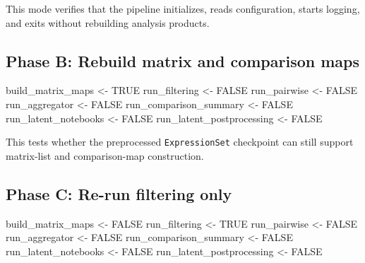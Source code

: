 \documentclass[
  letterpaper,
  DIV=11,
  numbers=noendperiod,
  openany,
  oneside]{scrreprt}
\newenvironment{Shaded}{\begin{snugshade}}{\end{snugshade}}
\newcommand{\ConstantTok}[1]{\textcolor[rgb]{0.56,0.35,0.01}{#1}}
\newcommand{\NormalTok}[1]{\textcolor[rgb]{0.00,0.23,0.31}{#1}}
\newcommand{\OtherTok}[1]{\textcolor[rgb]{0.00,0.23,0.31}{#1}}
\begin{document}
This mode verifies that the pipeline initializes, reads configuration,
starts logging, and exits without rebuilding analysis products.

\subsection*{Phase B: Rebuild matrix and comparison
maps}\label{phase-b-rebuild-matrix-and-comparison-maps}

\begin{Shaded}
\begin{Highlighting}[]
\NormalTok{build\_matrix\_maps       }\OtherTok{\textless{}{-}} \ConstantTok{TRUE}
\NormalTok{run\_filtering           }\OtherTok{\textless{}{-}} \ConstantTok{FALSE}
\NormalTok{run\_pairwise            }\OtherTok{\textless{}{-}} \ConstantTok{FALSE}
\NormalTok{run\_aggregator          }\OtherTok{\textless{}{-}} \ConstantTok{FALSE}
\NormalTok{run\_comparison\_summary  }\OtherTok{\textless{}{-}} \ConstantTok{FALSE}
\NormalTok{run\_latent\_notebooks    }\OtherTok{\textless{}{-}} \ConstantTok{FALSE}
\NormalTok{run\_latent\_postprocessing }\OtherTok{\textless{}{-}} \ConstantTok{FALSE}
\end{Highlighting}
\end{Shaded}

This tests whether the preprocessed \texttt{ExpressionSet} checkpoint
can still support matrix-list and comparison-map construction.

\subsection*{Phase C: Re-run filtering
only}\label{phase-c-re-run-filtering-only}

\begin{Shaded}
\begin{Highlighting}[]
\NormalTok{build\_matrix\_maps       }\OtherTok{\textless{}{-}} \ConstantTok{FALSE}
\NormalTok{run\_filtering           }\OtherTok{\textless{}{-}} \ConstantTok{TRUE}
\NormalTok{run\_pairwise            }\OtherTok{\textless{}{-}} \ConstantTok{FALSE}
\NormalTok{run\_aggregator          }\OtherTok{\textless{}{-}} \ConstantTok{FALSE}
\NormalTok{run\_comparison\_summary  }\OtherTok{\textless{}{-}} \ConstantTok{FALSE}
\NormalTok{run\_latent\_notebooks    }\OtherTok{\textless{}{-}} \ConstantTok{FALSE}
\NormalTok{run\_latent\_postprocessing }\OtherTok{\textless{}{-}} \ConstantTok{FALSE}
\end{Highlighting}
\end{Shaded}
\end{document}

